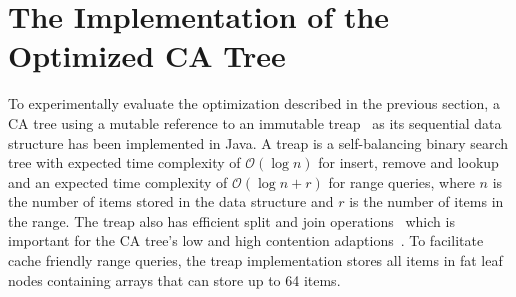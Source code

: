 \documentclass[a4paper,UKenglish]{oasics-v2016}
\begin{document}



\section{The Implementation of the Optimized CA Tree\label{immoptimpl}}
To experimentally evaluate the optimization described in the previous section, a CA tree using a mutable reference to an immutable treap~\cite{Seidel1996} as its sequential data structure has been implemented in Java.
A treap is a self-balancing binary search tree with expected time complexity of $\mathcal{O}(\log{}n)$ for insert, remove and lookup and an expected time complexity of $\mathcal{O}(\log{}n +r)$ for range queries, where $n$ is the number of items stored in the data structure and $r$ is the number of items in the range.
The treap also has efficient split and join operations~\cite{Seidel1996} which is important for the CA tree's low and high contention adaptions~\cite{CATreeISPDC}.
To facilitate cache friendly range queries, the treap implementation stores all items in fat leaf nodes containing arrays that can store up to 64 items.
\end{document}
